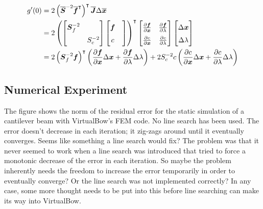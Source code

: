 \begin{align*}
\renewcommand{\arraystretch}{1.5}
g'(0) &= 2\left(\overline{\boldsymbol{S}}^{-2}\overline{\boldsymbol{f}}^\intercal\right)^\intercal\overline{\boldsymbol{J}}\Delta\overline{\boldsymbol{x}} \\
&= 2
\left(
\begin{bmatrix}
\boldsymbol{S}_{f}^{-2} & \\
& S_{c}^{-2}
\end{bmatrix}
\begin{bmatrix}
\boldsymbol{f} & \\
c
\end{bmatrix}
\right)^\intercal
\begin{bmatrix}
\frac{\partial\boldsymbol{f}}{\partial\boldsymbol{x}} & \frac{\partial\boldsymbol{f}}{\partial\lambda} \\
\frac{\partial c}{\partial \boldsymbol{x}} &  \frac{\partial c}{\partial \lambda}
\end{bmatrix}
\begin{bmatrix}
\Delta\boldsymbol{x} \\
\Delta\lambda
\end{bmatrix} \\
&= 2\left(\boldsymbol{S}_{f}^{-2}\boldsymbol{f}\right)^\intercal\left(\frac{\partial\boldsymbol{f}}{\partial\boldsymbol{x}}\Delta\boldsymbol{x} + \frac{\partial\boldsymbol{f}}{\partial\lambda}\Delta\lambda\right) + 2S_{c}^{-2}c\left(\frac{\partial c}{\partial\boldsymbol{x}}\Delta\boldsymbol{x} + \frac{\partial c}{\partial\lambda}\Delta\lambda\right)
\end{align*}

\subsection*{Numerical Experiment}

The figure shows the norm of the residual error for the static simulation of a cantilever beam with VirtualBow's FEM code.
No line search has been used.
The error doesn't decrease in each iteration; it zig-zags around until it eventually converges.
Seems like something a line search would fix?
The problem was that it never seemed to work when a line search was introduced that tried to force a monotonic decrease of the error in each iteration.
So maybe the problem inherently needs the freedom to increase the error temporarily in order to eventually converge?
Or the line search was not implemented correctly?
In any case, some more thought needs to be put into this before line searching can make its way into VirtualBow.

